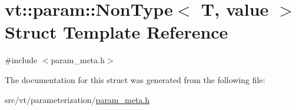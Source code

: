\hypertarget{structvt_1_1param_1_1_non_type}{}\section{vt\+:\+:param\+:\+:Non\+Type$<$ T, value $>$ Struct Template Reference}
\label{structvt_1_1param_1_1_non_type}


{\ttfamily \#include $<$param\+\_\+meta.\+h$>$}



The documentation for this struct was generated from the following file\+:\begin{DoxyCompactItemize}
\item 
src/vt/parameterization/\hyperlink{param__meta_8h}{param\+\_\+meta.\+h}\end{DoxyCompactItemize}
